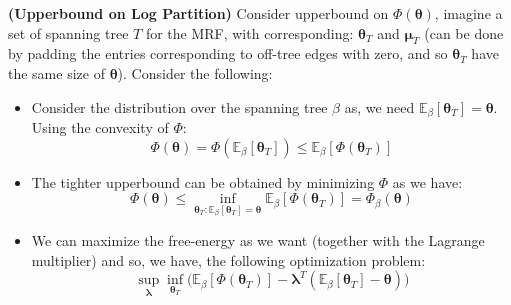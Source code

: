 \begin{remark}{\textbf{(Upperbound on Log Partition)}}
    Consider upperbound on $\Phi(\boldsymbol \theta)$, imagine a set of spanning tree $T$ for the MRF, with corresponding: $\boldsymbol \theta_T$ and $\boldsymbol \mu_T$ (can be done by padding the entries corresponding to off-tree edges with zero, and so $\boldsymbol \theta_T$ have the same size of $\boldsymbol \theta$). Consider the following:
    \begin{itemize}
        \item Consider the distribution over the spanning tree $\beta$ as, we need $\mathbb{E}_\beta[\boldsymbol \theta_T] = \boldsymbol \theta$. Using the convexity of $\Phi$:
        \begin{equation*}
            \Phi(\boldsymbol \theta) = \Phi(\mathbb{E}_\beta[\boldsymbol \theta_T]) \le \mathbb{E}_\beta[\Phi(\boldsymbol \theta_T)]
        \end{equation*}
        \item The tighter upperbound can be obtained by minimizing $\Phi$ as we have:
        \begin{equation*}
            \Phi(\boldsymbol \theta) \le \inf_{ \boldsymbol\theta_T : \mathbb{E}_\beta[\boldsymbol \theta_T] = \boldsymbol \theta} \mathbb{E}_\beta[\Phi(\boldsymbol \theta_T)] = \Phi_\beta(\boldsymbol \theta)
        \end{equation*}
        \item We can maximize the free-energy as we want (together with the Lagrange multiplier) and so, we have, the following optimization problem:
        \begin{equation*}
            \sup_{\boldsymbol \lambda}\inf_{\boldsymbol \theta_T} \Big(\mathbb{E}_\beta[\Phi(\boldsymbol \theta_T)] - \boldsymbol\lambda^T(\mathbb{E}_\beta[\boldsymbol \theta_T] - \boldsymbol \theta)\Big)
        \end{equation*}
    \end{itemize}
\end{remark}

